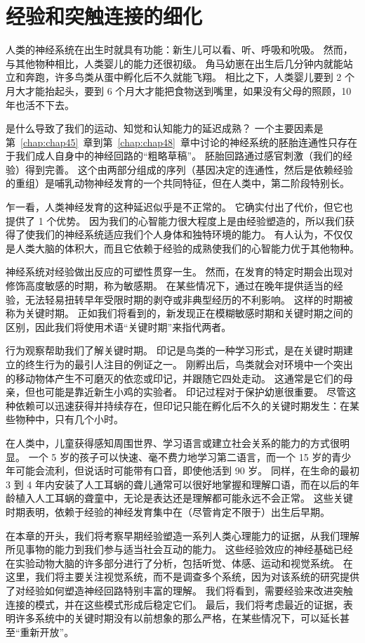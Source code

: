\chapter{经验和突触连接的细化} \label{chap:chap49}


人类的神经系统在出生时就具有功能：新生儿可以看、听、呼吸和吮吸。
然而，与其他物种相比，人类婴儿的能力还很初级。
角马幼崽在出生后几分钟内就能站立和奔跑，许多鸟类从蛋中孵化后不久就能飞翔。
相比之下，人类婴儿要到 2 个月大才能抬起头，要到 6 个月大才能把食物送到嘴里，如果没有父母的照顾，10 年也活不下去。


是什么导致了我们的运动、知觉和认知能力的延迟成熟？
一个主要因素是第~\ref{chap:chap45}~章到第~\ref{chap:chap48}~章中讨论的神经系统的胚胎连通性只存在于我们成人自身中的神经回路的“粗略草稿”。
胚胎回路通过感官刺激（我们的经验）得到完善。
这个由两部分组成的序列（基因决定的连通性，然后是依赖经验的重组）是哺乳动物神经发育的一个共同特征，但在人类中，第二阶段特别长。


乍一看，人类神经发育的这种延迟似乎是不正常的。
它确实付出了代价，但它也提供了 1 个优势。
因为我们的心智能力很大程度上是由经验塑造的，所以我们获得了使我们的神经系统适应我们个人身体和独特环境的能力。
有人认为，不仅仅是人类大脑的体积大，而且它依赖于经验的成熟使我们的心智能力优于其他物种。


神经系统对经验做出反应的可塑性贯穿一生。
然而，在发育的特定时期会出现对修饰高度敏感的时期，称为敏感期。
在某些情况下，通过在晚年提供适当的经验，无法轻易扭转早年受限时期的剥夺或非典型经历的不利影响。
这样的时期被称为关键时期。
正如我们将看到的，新发现正在模糊敏感时期和关键时期之间的区别，因此我们将使用术语“关键时期”来指代两者。


行为观察帮助我们了解关键时期。
印记是鸟类的一种学习形式，是在关键时期建立的终生行为的最引人注目的例证之一。
刚孵出后，鸟类就会对环境中一个突出的移动物体产生不可磨灭的依恋或印记，并跟随它四处走动。
这通常是它们的母亲，但也可能是靠近新生小鸡的实验者。
印记过程对于保护幼崽很重要。
尽管这种依赖可以迅速获得并持续存在，但印记只能在孵化后不久的关键时期发生：在某些物种中，只有几个小时。


在人类中，儿童获得感知周围世界、学习语言或建立社会关系的能力的方式很明显。
一个 5 岁的孩子可以快速、毫不费力地学习第二语言，而一个 15 岁的青少年可能会流利，但说话时可能带有口音，即使他活到 90 岁。
同样，在生命的最初 3 到 4 年内安装了人工耳蜗的聋儿通常可以很好地掌握和理解口语，而在以后的年龄植入人工耳蜗的聋童中，无论是表达还是理解都可能永远不会正常。
这些关键时期表明，依赖于经验的神经发育集中在（尽管肯定不限于）出生后早期。


在本章的开头，我们将考察早期经验塑造一系列人类心理能力的证据，从我们理解所见事物的能力到我们参与适当社会互动的能力。
这些经验效应的神经基础已经在实验动物大脑的许多部分进行了分析，包括听觉、体感、运动和视觉系统。
在这里，我们将主要关注视觉系统，而不是调查多个系统，因为对该系统的研究提供了对经验如何塑造神经回路特别丰富的理解。
我们将看到，需要经验来改进突触连接的模式，并在这些模式形成后稳定它们。
最后，我们将考虑最近的证据，表明许多系统中的关键时期没有以前想象的那么严格，在某些情况下，可以延长甚至“重新开放”。


